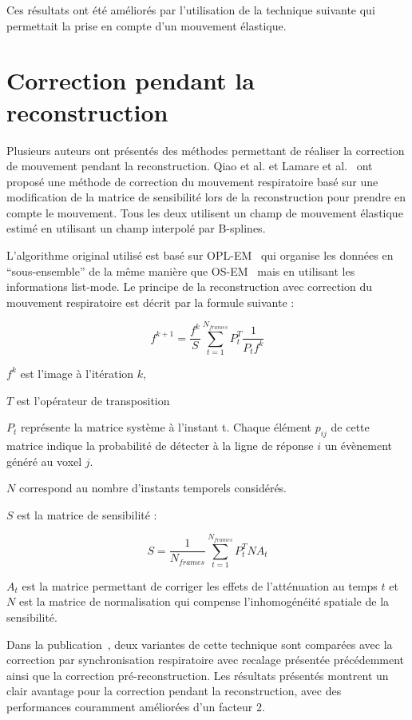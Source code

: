 Ces résultats ont été améliorés par l'utilisation de la technique suivante qui permettait la prise en compte d'un mouvement élastique.

\section{Correction pendant la reconstruction}
\label{lab:CorrpendantRecon}
Plusieurs auteurs ont présentés des méthodes permettant de réaliser la correction de mouvement pendant la reconstruction. Qiao et al.\cite{qiao2006motion} et Lamare et al.~\cite{lamare2007list} ont proposé une méthode de correction du mouvement respiratoire basé sur une modification de la matrice de sensibilité lors de la reconstruction pour prendre en compte le mouvement. Tous les deux utilisent un champ de mouvement élastique estimé en utilisant un champ interpolé par B-splines.

L'algorithme original utilisé est basé sur OPL-EM~\cite{reader2002one} qui organise les données en ``sous-ensemble'' de la même manière que OS-EM~\cite{hudson1994accelerated} mais en utilisant les informations list-mode. Le principe de la reconstruction avec correction du mouvement respiratoire est décrit par la formule suivante :

\label{lab:corrMatSyst}
\begin{equation}
 f^{k+1}=\frac{f^k}{S} \sum_{t=1}^{N_{frames}} P_t^T \frac{1}{P_t f^k} 
\end{equation}

$f^k$ est l'image à l'itération $k$,

$T$ est l'opérateur de transposition

$P_t$ représente la matrice système à l'instant t. Chaque élément $p_{ij}$ de cette matrice indique la probabilité de détecter à la ligne de réponse $i$ un évènement généré au voxel $j$. 

$N$ correspond au nombre d'instants temporels considérés.

$S$ est la matrice de sensibilité :

\begin{equation}
 S=\frac{1}{N_{frames}} \sum_{t=1}^{N_{frames}} P_t^T N A_t 
\end{equation}

 $A_t$ est la matrice permettant de corriger les effets de l'atténuation au temps $t$ et $N$ est la matrice de normalisation qui compense l'inhomogénéité spatiale de la sensibilité.

Dans la publication~\cite{lamare2007list}, deux variantes de cette technique sont comparées avec la correction par synchronisation respiratoire avec recalage présentée précédemment ainsi que la correction pré-reconstruction. Les résultats présentés montrent un clair avantage pour la correction pendant la reconstruction, avec des performances couramment améliorées d'un facteur 2. 

